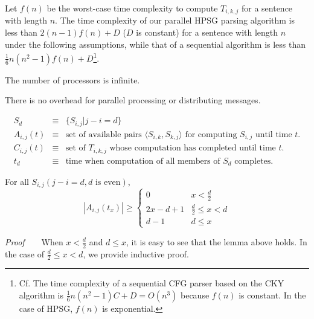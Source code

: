   Let $f(n)$ be the worst-case time complexity to compute $T_{i,k,j}$
for a sentence with length $n$.  The time complexity of our parallel
HPSG parsing algorithm is less than $2(n-1)f(n)+D$ ($D$ is constant)
for a sentence with length $n$ under the following assumptions, while
that of a sequential algorithm is less than
$\frac{1}{6}n(n^2-1)f(n)+D$\footnote{Cf. The time complexity of a
sequential CFG parser based on the CKY algorithm is
$\frac{1}{6}n(n^2-1)C+D = O(n^3)$ because $f(n)$ is constant.  In the
case of HPSG, $f(n)$ is exponential.}.

\begin{assumption}\label{assumption2}
  The number of processors is infinite.
\end{assumption}

\begin{assumption}\label{assumption3}
  There is no overhead for parallel processing or distributing messages.
\end{assumption}

\begin{definition}
\begin{eqnarray*}
S_d		& \equiv & \{S_{i,j} | j - i = d\}\\
A_{i,j}(t)	& \equiv & \mbox{set of available pairs $\langle S_{i,k}, S_{k,j} \rangle$ for computing $S_{i,j}$ until time $t$.}\\
C_{i,j}(t)	& \equiv & \mbox{set of $T_{i,k,j}$ whose computation has completed until time $t$.}\\
t_d		& \equiv & \mbox{time when computation of all members of $S_d$ completes.}
\end{eqnarray*}
\end{definition}

\begin{lemma}\label{lemma1}
 For all $S_{i,j}(j - i = d, d \mbox{ is even})$,
\[
|A_{i,j}(t_x)| \geq
\left\{
\begin{array}{ll}
0		& x < \frac{d}{2}\\
2x - d + 1	& \frac{d}{2} \leq x < d\\
d - 1		& d \leq x
\end{array}
\right.
\]
\end{lemma}

{\it Proof} ~ ~ When $x < \frac{d}{2}$ and $d \leq x$, it is easy to see
that the lemma above holds.  In the case of $\frac{d}{2} \leq x < d$,
we provide inductive proof.

